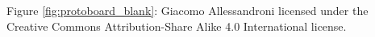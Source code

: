 Figure \ref{fig:protoboard_blank}: Giacomo Allessandroni licensed under the
Creative Commons Attribution-Share Alike 4.0 International license.
